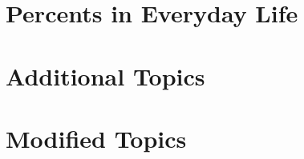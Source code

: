\documentclass[12pt, fleqn, openany, oneside]{studyGuide}
\begin{document}

\chapter{Percents in Everyday Life}









\chapter{Additional Topics}





\chapter{Modified Topics}




\printAnswerKey
\end{document}
